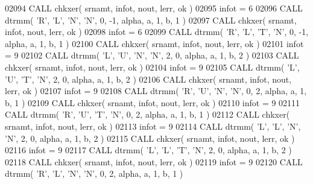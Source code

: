 \begin{DoxyCode}
02094       \textcolor{keyword}{CALL }chkxer( srnamt, infot, nout, lerr, ok )
02095       infot = 6
02096       \textcolor{keyword}{CALL }dtrmm( \textcolor{stringliteral}{'R'}, \textcolor{stringliteral}{'L'}, \textcolor{stringliteral}{'N'}, \textcolor{stringliteral}{'N'}, 0, -1, alpha, a, 1, b, 1 )
02097       \textcolor{keyword}{CALL }chkxer( srnamt, infot, nout, lerr, ok )
02098       infot = 6
02099       \textcolor{keyword}{CALL }dtrmm( \textcolor{stringliteral}{'R'}, \textcolor{stringliteral}{'L'}, \textcolor{stringliteral}{'T'}, \textcolor{stringliteral}{'N'}, 0, -1, alpha, a, 1, b, 1 )
02100       \textcolor{keyword}{CALL }chkxer( srnamt, infot, nout, lerr, ok )
02101       infot = 9
02102       \textcolor{keyword}{CALL }dtrmm( \textcolor{stringliteral}{'L'}, \textcolor{stringliteral}{'U'}, \textcolor{stringliteral}{'N'}, \textcolor{stringliteral}{'N'}, 2, 0, alpha, a, 1, b, 2 )
02103       \textcolor{keyword}{CALL }chkxer( srnamt, infot, nout, lerr, ok )
02104       infot = 9
02105       \textcolor{keyword}{CALL }dtrmm( \textcolor{stringliteral}{'L'}, \textcolor{stringliteral}{'U'}, \textcolor{stringliteral}{'T'}, \textcolor{stringliteral}{'N'}, 2, 0, alpha, a, 1, b, 2 )
02106       \textcolor{keyword}{CALL }chkxer( srnamt, infot, nout, lerr, ok )
02107       infot = 9
02108       \textcolor{keyword}{CALL }dtrmm( \textcolor{stringliteral}{'R'}, \textcolor{stringliteral}{'U'}, \textcolor{stringliteral}{'N'}, \textcolor{stringliteral}{'N'}, 0, 2, alpha, a, 1, b, 1 )
02109       \textcolor{keyword}{CALL }chkxer( srnamt, infot, nout, lerr, ok )
02110       infot = 9
02111       \textcolor{keyword}{CALL }dtrmm( \textcolor{stringliteral}{'R'}, \textcolor{stringliteral}{'U'}, \textcolor{stringliteral}{'T'}, \textcolor{stringliteral}{'N'}, 0, 2, alpha, a, 1, b, 1 )
02112       \textcolor{keyword}{CALL }chkxer( srnamt, infot, nout, lerr, ok )
02113       infot = 9
02114       \textcolor{keyword}{CALL }dtrmm( \textcolor{stringliteral}{'L'}, \textcolor{stringliteral}{'L'}, \textcolor{stringliteral}{'N'}, \textcolor{stringliteral}{'N'}, 2, 0, alpha, a, 1, b, 2 )
02115       \textcolor{keyword}{CALL }chkxer( srnamt, infot, nout, lerr, ok )
02116       infot = 9
02117       \textcolor{keyword}{CALL }dtrmm( \textcolor{stringliteral}{'L'}, \textcolor{stringliteral}{'L'}, \textcolor{stringliteral}{'T'}, \textcolor{stringliteral}{'N'}, 2, 0, alpha, a, 1, b, 2 )
02118       \textcolor{keyword}{CALL }chkxer( srnamt, infot, nout, lerr, ok )
02119       infot = 9
02120       \textcolor{keyword}{CALL }dtrmm( \textcolor{stringliteral}{'R'}, \textcolor{stringliteral}{'L'}, \textcolor{stringliteral}{'N'}, \textcolor{stringliteral}{'N'}, 0, 2, alpha, a, 1, b, 1 )

\end{DoxyCode}
